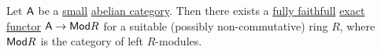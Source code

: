 \documentclass[../../../main]{subfiles}
\begin{document}
\begin{theorem} \label{thm:freyd-mitchell}
  Let \(\mathsf{A}\) be a \hyperref[def:small-category]{small} \hyperref[def:abelian-category]{abelian category}. Then there exists a \hyperref[def:functor-types]{fully faithfull} \hyperref[def:exact-functor]{exact functor} \(\mathsf{A} \to \mathsf{Mod}{R}\) for a suitable (possibly non-commutative) ring \(R\), where \(\mathsf{Mod}{R}\) is the category of left \(R\)-modules.
\end{theorem}
\end{document}
